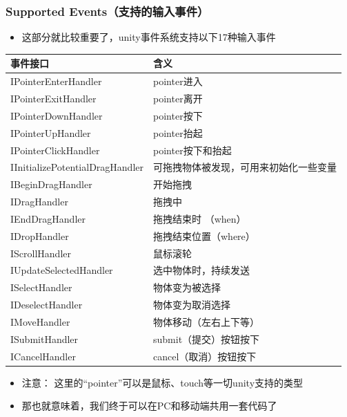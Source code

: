 \documentclass[9pt, b5paper]{article}
\begin{document}
\subsubsection{Supported Events（支持的输入事件）}
\label{sec:org2a6f1a2}
\begin{itemize}
\item 这部分就比较重要了，unity事件系统支持以下17种输入事件
\end{itemize}
\begin{center}
\begin{tabular}{ll}
\hline
事件接口 & 含义\\
\hline
IPointerEnterHandler & pointer进入\\
IPointerExitHandler & pointer离开\\
IPointerDownHandler & pointer按下\\
IPointerUpHandler & pointer抬起\\
IPointerClickHandler & pointer按下和抬起\\
IInitializePotentialDragHandler & 可拖拽物体被发现，可用来初始化一些变量\\
IBeginDragHandler & 开始拖拽\\
IDragHandler & 拖拽中\\
IEndDragHandler & 拖拽结束时 （when）\\
IDropHandler & 拖拽结束位置（where）\\
IScrollHandler & 鼠标滚轮\\
IUpdateSelectedHandler & 选中物体时，持续发送\\
ISelectHandler & 物体变为被选择\\
IDeselectHandler & 物体变为取消选择\\
IMoveHandler & 物体移动（左右上下等）\\
ISubmitHandler & submit（提交）按钮按下\\
ICancelHandler & cancel（取消）按钮按下\\
\hline
\end{tabular}
\end{center}
\begin{itemize}
\item 注意： 这里的“pointer”可以是鼠标、touch等一切unity支持的类型
\item 那也就意味着，我们终于可以在PC和移动端共用一套代码了
\end{itemize}
\end{document}
